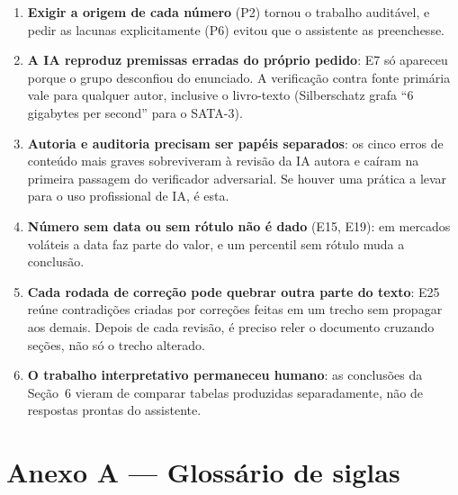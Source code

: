 \documentclass[11pt,a4paper]{article}
\begin{document}
\begin{enumerate}[label=\textbf{L\arabic*.},leftmargin=*]
\item \textbf{Exigir a origem de cada número} (P2) tornou o trabalho auditável, e pedir as
      lacunas explicitamente (P6) evitou que o assistente as preenchesse.
\item \textbf{A IA reproduz premissas erradas do próprio pedido}: E7 só apareceu porque o grupo
      desconfiou do enunciado. A verificação contra fonte primária vale para qualquer autor,
      inclusive o livro-texto (Silberschatz grafa ``6 gigabytes per second'' para o SATA-3).
\item \textbf{Autoria e auditoria precisam ser papéis separados}: os cinco erros de conteúdo
      mais graves sobreviveram à revisão da IA autora e caíram na primeira passagem do
      verificador adversarial. Se houver uma prática a levar para o uso profissional de IA, é
      esta.
\item \textbf{Número sem data ou sem rótulo não é dado} (E15, E19): em mercados voláteis a data
      faz parte do valor, e um percentil sem rótulo muda a conclusão.
\item \textbf{Cada rodada de correção pode quebrar outra parte do texto}: E25 reúne
      contradições criadas por correções feitas em um trecho sem propagar aos demais. Depois de
      cada revisão, é preciso reler o documento cruzando seções, não só o trecho alterado.
\item \textbf{O trabalho interpretativo permaneceu humano}: as conclusões da Seção~6 vieram de
      comparar tabelas produzidas separadamente, não de respostas prontas do assistente.
\end{enumerate}

\section*{Anexo A --- Glossário de siglas}
\end{document}
